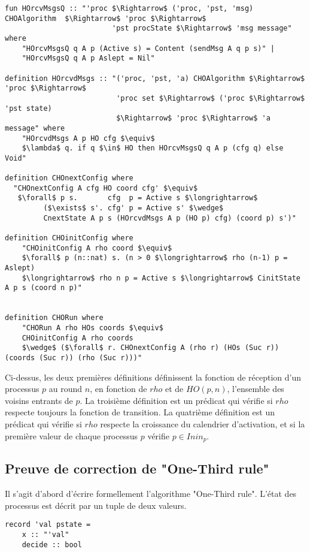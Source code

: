 \documentclass{article}
\begin{document}
\begin{lstlisting}[mathescape=true]
fun HOrcvMsgsQ :: "'proc $\Rightarrow$ ('proc, 'pst, 'msg) CHOAlgorithm  $\Rightarrow$ 'proc $\Rightarrow$
                         'pst procState $\Rightarrow$ 'msg message" where
	"HOrcvMsgsQ q A p (Active s) = Content (sendMsg A q p s)" |
	"HOrcvMsgsQ q A p Aslept = Nil"

definition HOrcvdMsgs :: "('proc, 'pst, 'a) CHOAlgorithm $\Rightarrow$ 'proc $\Rightarrow$
                          'proc set $\Rightarrow$ ('proc $\Rightarrow$ 'pst state)
                          $\Rightarrow$ 'proc $\Rightarrow$ 'a message" where
	"HOrcvdMsgs A p HO cfg $\equiv$
	$\lambda$ q. if q $\in$ HO then HOrcvMsgsQ q A p (cfg q) else Void"

definition CHOnextConfig where
  "CHOnextConfig A cfg HO coord cfg' $\equiv$
   $\forall$ p s.       cfg  p = Active s $\longrightarrow$
         ($\exists$ s'. cfg' p = Active s' $\wedge$
		 CnextState A p s (HOrcvdMsgs A p (HO p) cfg) (coord p) s')"

definition CHOinitConfig where
	"CHOinitConfig A rho coord $\equiv$
	$\forall$ p (n::nat) s. (n > 0 $\longrightarrow$ rho (n-1) p = Aslept)
	$\longrightarrow$ rho n p = Active s $\longrightarrow$ CinitState A p s (coord n p)"


definition CHORun where
	"CHORun A rho HOs coords $\equiv$
	CHOinitConfig A rho coords
	$\wedge$ ($\forall$ r. CHOnextConfig A (rho r) (HOs (Suc r)) (coords (Suc r)) (rho (Suc r)))"
\end{lstlisting}

Ci-dessus, les deux premières définitions définissent la fonction de réception d'un processus $p$ au round $n$, en fonction de $rho$ et de $HO(p, n)$, l'ensemble des voisins entrants de $p$.
La troisième définition est un prédicat qui vérifie si $rho$ respecte toujours la fonction de transition.
La quatrième définition est un prédicat qui vérifie si $rho$ respecte la croissance du calendrier d'activation, et si la première valeur de chaque processus $p$ vérifie $p \in Inin_p$.

\subsection{Preuve de correction de "One-Third rule"}

Il s'agit d'abord d'écrire formellement l'algorithme "One-Third rule".
L'état des processus est décrit par un tuple de deux valeurs.

\begin{lstlisting}
record 'val pstate =
	x :: "'val"
	decide :: bool
\end{lstlisting}
\end{document}
